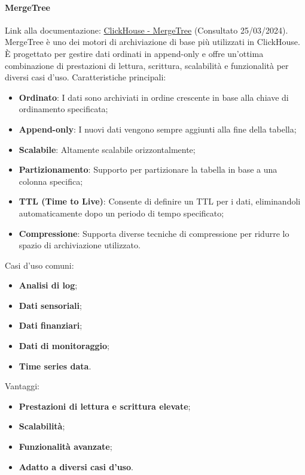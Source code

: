 \paragraph{MergeTree}\label{sec:MergeTree}
Link alla documentazione: \href{https://clickhouse.com/docs/en/engines/table-engines/mergetree-family/mergetree#mergetree}{ClickHouse - MergeTree} (Consultato 25/03/2024).\newline
MergeTree è uno dei motori di archiviazione di base più utilizzati in ClickHouse. È progettato per gestire dati ordinati in append-only e offre un'ottima combinazione di prestazioni di lettura, scrittura, scalabilità e funzionalità per diversi casi d'uso.
Caratteristiche principali:
\begin{itemize}
  \item \textbf{Ordinato}: I dati sono archiviati in ordine crescente in base alla chiave di ordinamento specificata;
  \item \textbf{Append-only}: I nuovi dati vengono sempre aggiunti alla fine della tabella;
  \item \textbf{Scalabile}: Altamente scalabile orizzontalmente;
  \item \textbf{Partizionamento}: Supporto per partizionare la tabella in base a una colonna specifica;
  \item \textbf{TTL (Time to Live)}: Consente di definire un TTL per i dati, eliminandoli automaticamente dopo un periodo di tempo specificato;
  \item \textbf{Compressione}: Supporta diverse tecniche di compressione per ridurre lo spazio di archiviazione utilizzato.
\end{itemize}

Casi d'uso comuni:
\begin{itemize}
  \item \textbf{Analisi di log};
  \item \textbf{Dati sensoriali};
  \item \textbf{Dati finanziari};
  \item \textbf{Dati di monitoraggio};
  \item \textbf{Time series data}.
\end{itemize}

Vantaggi:
\begin{itemize}
  \item \textbf{Prestazioni di lettura e scrittura elevate};
  \item \textbf{Scalabilità};
  \item \textbf{Funzionalità avanzate};
  \item \textbf{Adatto a diversi casi d'uso}.
\end{itemize}


